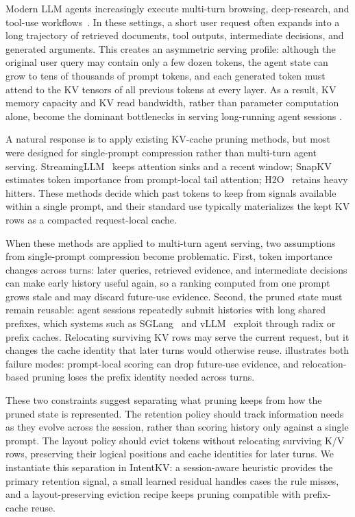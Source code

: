 \documentclass[11pt]{article}
\newcommand{\method}{IntentKV\xspace}
\begin{document}
Modern LLM agents increasingly execute multi-turn browsing,
deep-research, and tool-use workflows~\citep{yao2022react}. In these settings, a short user
request often expands into a long trajectory of retrieved documents,
tool outputs, intermediate decisions, and generated arguments. This
creates an asymmetric serving profile: although the original user
query may contain only a few dozen tokens, the agent state can grow
to tens of thousands of prompt tokens, and each generated token must
attend to the KV tensors of all previous tokens at every layer. As a
result, KV memory capacity and KV read bandwidth, rather than
parameter computation alone, become the dominant bottlenecks in
serving long-running agent sessions
\citep{li2024survey,zheng2024sglang}.

A natural response is to apply existing KV-cache pruning methods, but
most were designed for single-prompt compression rather than
multi-turn agent serving. StreamingLLM~\citep{xiao2024efficient} keeps
attention sinks and a recent window; SnapKV~\citep{li2024snapkv} estimates
token importance from prompt-local tail attention; H2O~\citep{zhang2023h2o}
retains heavy hitters. These methods decide which past tokens to keep from
signals available within a single prompt, and their standard use
typically materializes the kept KV rows as a compacted request-local
cache.

When these methods are applied to multi-turn agent serving, two
assumptions from single-prompt compression become problematic. First,
token importance changes across turns: later queries, retrieved
evidence, and intermediate decisions can make early history useful
again, so a ranking computed from one prompt grows stale and may
discard future-use evidence. Second, the pruned state must remain reusable: agent
sessions repeatedly submit histories with long shared prefixes, which
systems such as SGLang~\citep{zheng2024sglang} and vLLM~\citep{kwon2023efficient} exploit
through radix or prefix caches. Relocating surviving KV rows may
serve the current request, but it changes the cache identity that
later turns would otherwise reuse.
 illustrates both failure
modes: prompt-local scoring can drop future-use evidence, and
relocation-based pruning loses the prefix identity needed across
turns.

These two constraints suggest separating what pruning keeps from how
the pruned state is represented. The retention policy should track
information needs as they evolve across the session, rather than
scoring history only against a single prompt. The layout policy should
evict tokens without relocating surviving K/V rows, preserving their
logical positions and cache identities for later turns. We instantiate
this separation in \method: a session-aware heuristic provides the
primary retention signal, a small learned residual handles cases the
rule misses, and a layout-preserving eviction recipe keeps pruning
compatible with prefix-cache reuse.
\end{document}
